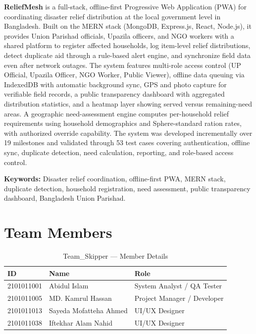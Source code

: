 \documentclass[11pt,a4paper]{report}
\renewcommand{\headrulewidth}{0.4pt}
\renewcommand{\footrulewidth}{0.2pt}
\renewcommand{\headrulewidth}{0pt}
\renewcommand{\footrulewidth}{0.2pt}
\renewcommand{\headrulewidth}{0pt}
\renewcommand{\footrulewidth}{0.2pt}
\renewcommand{\headrulewidth}{0pt}
\renewcommand{\footrulewidth}{0.2pt}
\renewcommand{\headrulewidth}{0.4pt}
\renewcommand{\footrulewidth}{0.2pt}
\begin{document}
\textbf{ReliefMesh} is a full-stack, offline-first Progressive Web Application (PWA) for coordinating disaster relief distribution at the local government level in Bangladesh. Built on the MERN stack (MongoDB, Express.js, React, Node.js), it provides Union Parishad officials, Upazila officers, and NGO workers with a shared platform to register affected households, log item-level relief distributions, detect duplicate aid through a rule-based alert engine, and synchronize field data even after network outages. The system features multi-role access control (UP Official, Upazila Officer, NGO Worker, Public Viewer), offline data queuing via IndexedDB with automatic background sync, GPS and photo capture for verifiable field records, a public transparency dashboard with aggregated distribution statistics, and a heatmap layer showing served versus remaining-need areas. A geographic need-assessment engine computes per-household relief requirements using household demographics and Sphere-standard ration rates, with authorized override capability. The system was developed incrementally over 19 milestones and validated through 53 test cases covering authentication, offline sync, duplicate detection, need calculation, reporting, and role-based access control.

\medskip
\noindent\textbf{Keywords:} Disaster relief coordination, offline-first PWA, MERN stack, duplicate detection, household registration, need assessment, public transparency dashboard, Bangladesh Union Parishad.

\clearpage
{}
\setcounter{page}{1}
\pagestyle{fancy}
\fancyhf{}
\fancyfoot[C]{\thepage}
\renewcommand{\headrulewidth}{0.4pt}
\renewcommand{\footrulewidth}{0.2pt}

\chapter*{Team Members}
\thispagestyle{plain}

\begin{table}[H]
\centering
\caption{Team\_Skipper — Member Details}
\label{tab:team}
\begin{tabularx}{\textwidth}{@{}lXX@{}}
\toprule
\textbf{ID} & \textbf{Name} & \textbf{Role} \\
\midrule
2101011001 & Abidul Islam          & System Analyst / QA Tester \\
2101011005 & MD. Kamrul Hassan     & Project Manager / Developer \\
2101011013 & Sayeda Mofatteha Ahmed & UI/UX Designer \\
2101011038 & Iftekhar Alam Nahid    & UI/UX Designer \\
\bottomrule
\end{tabularx}
\end{table}
\end{document}
